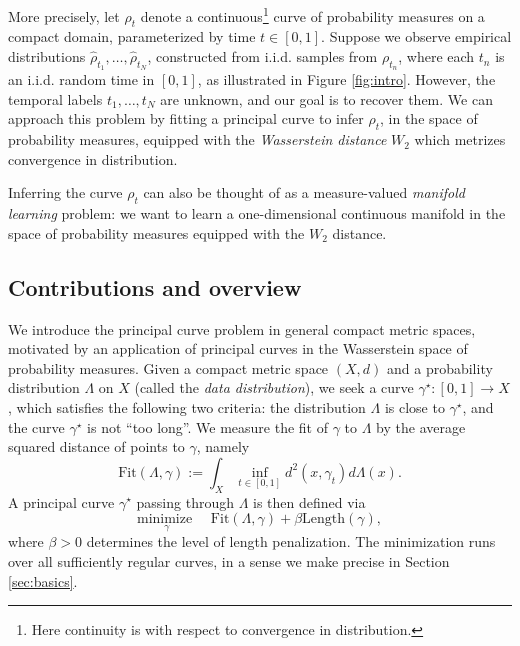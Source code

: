 \documentclass[aos, preprint]{imsart}
\theoremstyle{plain}
\theoremstyle{remark}
\begin{document}
More precisely,
let $\rho_{t}$ denote a continuous\footnote{Here continuity is with respect to convergence in distribution.} curve of probability measures on a compact domain, parameterized by time $t\in [0,1].$
Suppose we observe empirical distributions $\hat \rho_{t_1},\ldots,\hat \rho_{t_N}$, constructed from i.i.d. samples from $\rho_{t_n}$, where each $t_n$ is an i.i.d. random time in $[0,1]$, as illustrated in Figure \ref{fig:intro}. However, the temporal labels $t_1,\ldots,t_N$ are unknown, and our goal is to recover them. We can approach this problem by fitting a principal curve to infer $\rho_{t}$, in the space of probability measures, equipped with the \emph{Wasserstein distance }$W_{2}$ which metrizes convergence in distribution.

Inferring the curve $\rho_t$ can also be thought of as a measure-valued \emph{manifold learning }problem: we
want to learn a one-dimensional continuous manifold in the space of
probability measures equipped with the $W_{2}$ distance.

\subsection{Contributions and overview}

We introduce
the principal curve problem in general compact metric spaces, motivated by an application of principal curves in the Wasserstein space of probability measures. Given a compact metric space $(X,d)$ and a probability distribution $\Lambda$ on $X$ (called the {\em data distribution}),
we seek a curve $\gamma^\star : [0,1] \to X$, which satisfies the
following two criteria: the distribution $\Lambda$ is close to
$\gamma^\star$, and the curve $\gamma^\star$ is not ``too long''. We measure the fit of $\gamma$ to $\Lambda$ by the average squared distance of points to $\gamma$, namely
$$\text{Fit}(\Lambda,\gamma) := \int_{X}\inf_{t\in[0,1]}d^{2}(x,\gamma_{t})d\Lambda(x).$$
A principal curve $\gamma^\star$ passing through $\Lambda$ is then defined via
\begin{equation}
\underset{\gamma}{\text{minimize }} \quad
\text{Fit}(\Lambda, \gamma) + \beta\text{Length}(\gamma), \label{eq:ppc-metric-intro}
\end{equation}
where $\beta >0$ determines the level of length penalization. The minimization runs over all
sufficiently regular curves, in a sense we make precise in Section \ref{sec:basics}.
\end{document}
